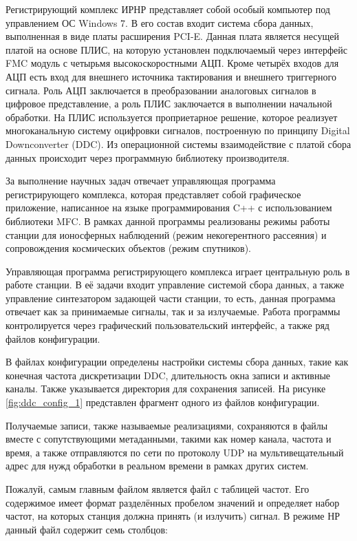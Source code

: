 \documentclass{report}
\begin{document}
Регистрирующий комплекс ИРНР представляет собой особый компьютер под управлением ОС Windows 7. В его состав входит система сбора данных, выполненная в виде платы расширения PCI-E. Данная плата является несущей платой на основе ПЛИС, на которую установлен подключаемый через интерфейс FMC модуль с четырьмя высокоскоростными АЦП. Кроме четырёх входов для АЦП есть вход для внешнего источника тактирования и внешнего триггерного сигнала. Роль АЦП заключается в преобразовании аналоговых сигналов в цифровое представление, а роль ПЛИС заключается в выполнении начальной обработки. На ПЛИС используется проприетарное решение, которое реализует многоканальную систему оцифровки сигналов, построенную по принципу Digital Downconverter (DDC). Из операционной системы взаимодействие с платой сбора данных происходит через программную библиотеку производителя.

За выполнение научных задач отвечает управляющая программа регистрирующего комплекса, которая представляет собой графическое приложение, написанное на языке программирования C++ с использованием библиотеки MFC. В рамках данной программы реализованы режимы работы станции для ионосферных наблюдений (режим некогерентного рассеяния) и сопровождения космических объектов (режим спутников).

Управляющая программа регистрирующего комплекса играет центральную роль в работе станции. В её задачи входит управление системой сбора данных, а также управление синтезатором задающей части станции, то есть, данная программа отвечает как за принимаемые сигналы, так и за излучаемые. Работа программы контролируется через графический пользовательский интерфейс, а также ряд файлов конфигурации.

В файлах конфигурации определены настройки системы сбора данных, такие как конечная частота дискретизации DDC, длительность окна записи и активные каналы. Также указывается директория для сохранения записей. На рисунке \ref{fig:ddc_config_1} представлен фрагмент одного из файлов конфигурации.


Получаемые записи, также называемые реализациями, сохраняются в файлы вместе с сопутствующими метаданными, такими как номер канала, частота и время, а также отправляются по сети по протоколу UDP на мультивещательный адрес для нужд обработки в реальном времени в рамках других систем.

Пожалуй, самым главным файлом является файл с таблицей частот. Его содержимое имеет формат разделённых пробелом значений и определяет набор частот, на которых станция должна принять (и излучить) сигнал. В режиме НР данный файл содержит семь столбцов:
\end{document}
